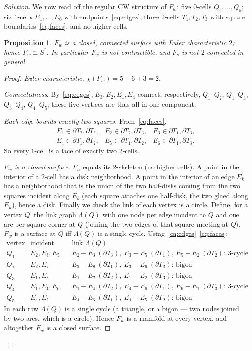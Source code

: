 \documentclass{amsart}
\newtheorem{proposition}{Proposition}
\theoremstyle{definition}
\newcommand{\bdy}{\partial}
\begin{document}
\begin{proof}[Solution]
We now read off the regular CW structure of $F_w$: five $0$-cells $Q_1,\dots,Q_5$; six
$1$-cells $E_1,\dots,E_6$ with endpoints~\eqref{eq:edges}; three $2$-cells $T_1,T_2,T_3$ with
square boundaries~\eqref{eq:faces}; and no higher cells.

\begin{proposition}\label{prop:s2}
$F_w$ is a closed, connected surface with Euler characteristic $2$; hence $F_w\cong S^2$. In
particular $F_w$ is not contractible, and $F_s$ is not $2$-connected in general.
\end{proposition}

\begin{proof}
\emph{Euler characteristic.} $\chi(F_w)=5-6+3=2$.

\emph{Connectedness.} By~\eqref{eq:edges}, $E_3,E_2,E_1,E_4$ connect, respectively, $Q_1$--$Q_2$,
$Q_1$--$Q_3$, $Q_3$--$Q_4$, $Q_4$--$Q_5$; these five vertices are thus all in one component.

\emph{Each edge bounds exactly two squares.} From~\eqref{eq:faces},
\[
\begin{array}{lll}
E_1\in\bdy T_2,\bdy T_3, & E_2\in\bdy T_2,\bdy T_3, & E_3\in\bdy T_1,\bdy T_3,\\
E_4\in\bdy T_1,\bdy T_2, & E_5\in\bdy T_1,\bdy T_2, & E_6\in\bdy T_1,\bdy T_3.
\end{array}
\]
So every $1$-cell is a face of exactly two $2$-cells.

\emph{$F_w$ is a closed surface.} $F_w$ equals its $2$-skeleton (no higher cells). A point in
the interior of a $2$-cell has a disk neighborhood. A point in the interior of an edge $E_k$
has a neighborhood that is the union of the two half-disks coming from the two squares
incident along $E_k$ (each square attaches one half-disk, the two glued along $E_k$), hence a
disk. Finally we check the link of each vertex is a circle. Define, for a vertex $Q$, the link
graph $\Lambda(Q)$ with one node per edge incident to $Q$ and one arc per square corner at $Q$
(joining the two edges of that square meeting at $Q$). $F_w$ is a surface at $Q$ iff
$\Lambda(Q)$ is a single cycle. Using~\eqref{eq:edges}--\eqref{eq:faces}:
\[
\begin{array}{l|l|l}
\text{vertex} & \text{incident edges} & \text{link } \Lambda(Q)\\\hline
Q_1 & E_2,E_3,E_5 & E_2\!-\!E_3\ (\bdy T_3),\ E_3\!-\!E_5\ (\bdy T_1),\ E_5\!-\!E_2\ (\bdy T_2):\ \text{3-cycle}\\
Q_2 & E_3,E_6 & E_3\!-\!E_6\ (\bdy T_1),\ E_3\!-\!E_6\ (\bdy T_3):\ \text{bigon}\\
Q_3 & E_1,E_2 & E_1\!-\!E_2\ (\bdy T_2),\ E_1\!-\!E_2\ (\bdy T_3):\ \text{bigon}\\
Q_4 & E_1,E_4,E_6 & E_1\!-\!E_4\ (\bdy T_2),\ E_4\!-\!E_6\ (\bdy T_1),\ E_6\!-\!E_1\ (\bdy T_3):\ \text{3-cycle}\\
Q_5 & E_4,E_5 & E_4\!-\!E_5\ (\bdy T_1),\ E_4\!-\!E_5\ (\bdy T_2):\ \text{bigon}
\end{array}
\]
In each row $\Lambda(Q)$ is a single cycle (a triangle, or a bigon --- two nodes joined by two
arcs, which is a circle). Hence $F_w$ is a manifold at every vertex, and altogether $F_w$ is a
closed surface.


\end{proof}
\end{proof}
\end{document}
